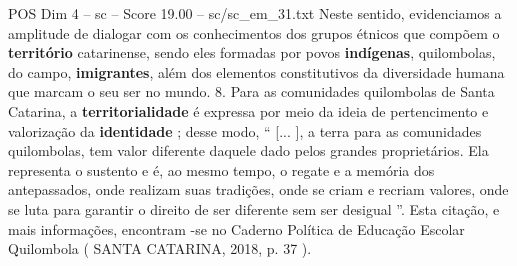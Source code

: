 \begin{textsample}{POS Dim 4 – sc – Score 19.00 – sc/sc\_em\_31.txt}
Neste sentido, evidenciamos a amplitude de dialogar com os conhecimentos dos grupos étnicos que compõem o \textbf{território} catarinense, sendo eles formadas por povos \textbf{indígenas}, quilombolas, do campo, \textbf{imigrantes}, além dos elementos constitutivos da diversidade humana que marcam o seu ser no mundo. 8.
Para as comunidades quilombolas de Santa Catarina, a \textbf{territorialidade} é expressa por meio da ideia de pertencimento e valorização da \textbf{identidade} ; desse modo, “ [... ], a terra para as comunidades quilombolas, tem valor diferente daquele dado pelos grandes proprietários.
Ela representa o sustento e é, ao mesmo tempo, o regate e a memória dos antepassados, onde realizam suas tradições, onde se criam e recriam valores, onde se luta para garantir o direito de ser diferente sem ser desigual ”.
Esta citação, e mais informações, encontram -se no Caderno Política de Educação Escolar Quilombola ( SANTA CATARINA, 2018, p. 37 ).

\end{textsample}
